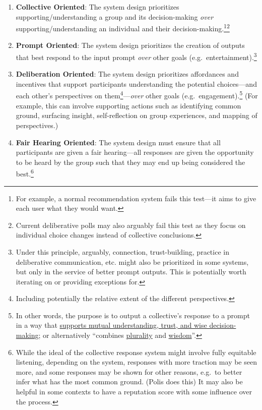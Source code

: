 \documentclass[sigconf,authorversion,nonacm,linkcolor=blue,colorlinks]{acmart}
\def\tightlist{} %
\begin{document}
\begin{enumerate}
\tightlist
\item
  \textbf{Collective Oriented}: The system design prioritizes {supporting/understanding a group and its decision-making} \emph{over} supporting/understanding an individual and their decision-making.\footnote{For example, a normal recommendation system fails this test---it aims to give each user what they would want.}\footnote{Current deliberative polls may also arguably fail this test as they focus on individual choice changes instead of collective conclusions.}
\item
  \textbf{Prompt Oriented}: The system design prioritizes the creation of {outputs that best respond to the input prompt} \emph{over} other goals (e.g.~entertainment).\footnote{Under this principle, arguably, connection, trust-building, practice in deliberative communication, etc. might also be prioritized in some systems, but only in the service of better prompt outputs. This is potentially worth iterating on or providing exceptions for.}
\item
  \textbf{Deliberation Oriented}: The system design prioritizes affordances and incentives that support {participants understanding the potential choices---and each other's perspectives on them}\footnote{Including potentially the relative extent of the different perspectives.}---\emph{over} other goals (e.g.~engagement).\footnote{In other words, the purpose is to output a collective's response to a prompt in a way that \href{https://www.belfercenter.org/publication/holding-platforms-accountable-not-enough-we-need-compass-social-technologies}{supports mutual understanding, trust, and wise decision-making}; or alternatively ``combines \href{https://www.radicalxchange.org/media/blog/plurality-technology-for-collaborative-diversity-and-democracy/}{plurality} and \href{https://aviv.medium.com/building-wise-systems-combining-competence-alignment-and-robustness-a9ed872468d3}{wisdom}''.} (For example, this can involve supporting actions such as identifying common ground, surfacing insight, self-reflection on group experiences, and mapping of perspectives.)
\item
  \textbf{Fair Hearing Oriented}: The system design must ensure that all participants are given a fair hearing---{all responses are given the opportunity to be heard by the group such that they may end up being considered the best}.\footnote{While the ideal of the collective response system might involve fully equitable listening, depending on the system, responses with more traction may be seen more, and some responses may be shown for other reasons, e.g.~to better infer what has the most common ground. (Polis does this) It may also be helpful in some contexts to have a reputation score with some influence over the process.}
\end{enumerate}
\end{document}
